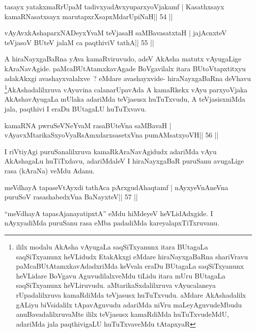 \begin{shl}
tasayx yatakxmaRrUpaM tadivxyadAvxyuparxyoVjakamf |
Kasathxsayx kamaRNasatxsayx marutapxrXsapxMdarUpiNaH\hfill || 54 ||
\end{shl}

\begin{shl}
vAyAvxkAshaparxNADeyxYvaM teVjasaH saMBavasatxtaH |
jajAcnxteV teVjasoV BUteV jalaM ca paqthiviV tathA\hfill || 55 ||
\end{shl}

\begin{artha}
A hiraNayxgaBaRna yAva kamaRviruvudo, adeV AkAsha matutx vAyugaLige
kAraNavAgide. paMcaBUtAtamxkavAgade BoVgavilalx itara BUtoVtapxtitxyu
adakAkxgi avashayxvalalxve~? eMdare avashayxvide- hiraNayxgaBaRna
deVhavu \footnote{ililx modalu AkAsha vAyugaLa saqSiTxyanunx itara
BUtagaLa saqSiTxyanunx heVLidudx EtakAkxgi eMdare hiraNayxgaBaRna
shariVravu paMcaBUtAtamxkavAdadxriMda keVvala eraDu BUtagaLa
saqSiTxyanunx heVLidare BoVgavu AguvudilalxveMdu tiLidu itara mUru
BUtagaLa saqSiTxyanunx heVLiruvudu. aMtarikaSxdalilxruva
vAyucalaneya rUpadalilxruva kamaRdiMda teVjasusx huTuTxvudu. aMdare
AkAshadalilx gALiyu biVsidalilx tApavAguvudu adariMda niVru
maLeyAguvudeMbudu anuBavadalilxruvaMte ililx teVjasusx kamaRdiMda
huTuTxvudeMdU, adariMda jala paqthivigaLU huTuTxvaveMdu tAtapxyaR}AkAshadalilxruva vAyuvina calanarUpavAda A
kamaRkekx vAyu parxyoVjaka AkAshavAyugaLa mUlaka adariMda teVjasusx huTuTxvudu, A
teVjasisxniMda jala, paqthivi I eraDu BUtagaLU huTuTxvavu.
\end{artha}

\begin{shl}
kamaRNA pwruSeVNeYvaM rasaBUteVna saMBavaH |
vAyavxMtarikaSxyoVyaRsAmxdarxsasetxVna pumAMsatxyoVH\hfill || 56 ||
\end{shl}

\begin{artha}
I riVtiyAgi puruSanalilxruva kamaRkAraNavAgidudx adariMda vAyu AkAshagaLu huTiTxdavu, adariMdaleV I hiraNayxgaBaR puruSanu avugaLige rasa (kAraNa) veMdu Adanu.
\end{artha}

\begin{shl}
meVdhayA tapaseVtAyxdi tathAca pArxgudAhaqtamf |
nAyxyeVnAneVna puruSoV rasashabedxVna BaNayxteV\hfill || 57 ||
\end{shl}

\begin{artha}
``meVdhayA tapasA\s janayatipxtA'' eMdu hiMdeyeV heVLidAdxgide. I nAyxyadiMda puruSanu rasa eMba padadiMda kareyalapxTiTxruvanu.
\end{artha}

